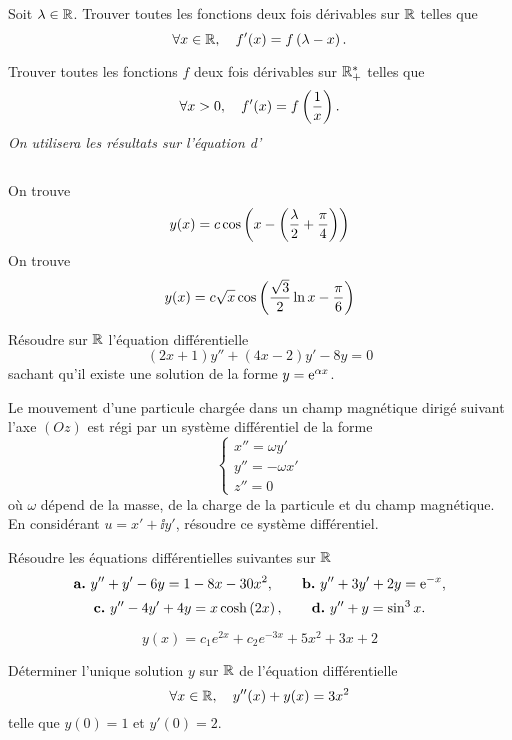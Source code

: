 \documentclass{magnolia}
\begin{document}
\begin{questions}
\item Soit $\lambda\in\mathbb{R}$. Trouver toutes les fonctions deux fois dérivables
  sur $\mathbb{R}$ telles que
  $$\forall x\in\mathbb{R} ,\quad f'(x)=f\left(\lambda-x\right).$$
\item Trouver toutes les fonctions $f$ deux fois dérivables sur $\mathbb{R}_+^*$ telles
  que
  $$\forall x>0 ,\quad f'(x)=f\left(\frac{1}{x}\right).$$
  {\it On utilisera les résultats sur l'équation d'}
\end{questions}
\begin{sol}
$\quad$
\begin{questions}
\question On trouve
  \[y(x)=c\cos\left(x-\left(\frac{\lambda}{2}+\frac{\pi}{4}\right)\right)\]
\question On trouve
  \[y(x)=c\sqrt{x}\cos\left(\frac{\sqrt{3}}{2}\ln x-\frac{\pi}{6}\right)\]
\end{questions}
\end{sol}


Résoudre sur $\mathbb{R}$ l'équation différentielle
\[(2x+1)y''+(4x-2)y'-8y=0\]
sachant qu'il existe une solution de la forme $y={\rm e}^{\alpha x}$.

Le mouvement d'une particule chargée dans un champ magnétique dirigé suivant
l'axe $(Oz)$ est régi par un système différentiel de la forme
$$\left\lbrace
\begin{array}{l}
x''=\omega y'\\
y''=-\omega x'\\
z''=0
\end{array}
\right.$$
où $\omega$ dépend de la masse, de la charge de la particule et du champ
magnétique. En considérant  $u=x'+\ii y'$, résoudre ce système différentiel.



Résoudre les équations différentielles suivantes sur $\mathbb{R}$
\[\textbf{a.}\ y''+y'-6y=1-8x-30x^2, \qquad \textbf{b.}\ y''+3y'+2y={\rm e}^{-x},\]
\[\textbf{c.}\ y''-4y'+4y=x\cosh\left(2x\right), \qquad \textbf{d.}\ y''+y=\sin^3 x.\]
\begin{sol}
\[y(x)=c_1 e^{2x}+c_2 e^{-3x}+5x^2+3x+2\]
\end{sol}



Déterminer l'unique solution $y$ sur $\mathbb{R}$ de l'équation différentielle
\[\forall x\in\mathbb{R},\quad y''(x)+y(x)=3x^2\]
telle que $y(0)=1$ et $y'(0)=2$.


\end{document}
